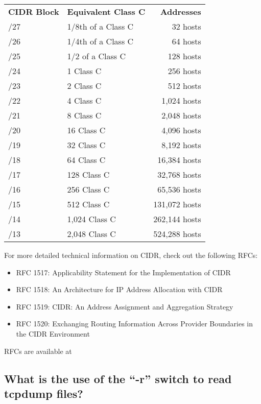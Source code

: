 \documentclass{article}
\begin{document}
\begin{center}
\begin{tabular}{llr}
{\bf CIDR Block} & {\bf Equivalent Class C} & {\bf Addresses}\\
/27 & 1/8th of a Class C & 32 hosts \\
/26 & 1/4th of a Class C & 64 hosts\\
/25 & 1/2 of a Class C & 128 hosts\\
/24 & 1 Class C & 256 hosts\\
/23 & 2 Class C & 512 hosts\\
/22 & 4 Class C & 1,024 hosts\\
/21 & 8 Class C & 2,048 hosts\\
/20 & 16 Class C & 4,096 hosts\\
/19 & 32 Class C & 8,192 hosts\\
/18 & 64 Class C & 16,384 hosts\\
/17 & 128 Class C & 32,768 hosts\\
/16 & 256 Class C & 65,536 hosts \\ 
/15 & 512 Class C & 131,072 hosts\\
/14 & 1,024 Class C & 262,144 hosts\\
/13 & 2,048 Class C & 524,288 hosts\\
\end{tabular}
\end{center}

For more detailed technical information on CIDR, check out the following RFCs:


\begin{itemize}
\item RFC 1517: Applicability Statement for the Implementation of CIDR
\item RFC 1518: An Architecture for IP Address Allocation with CIDR
\item RFC 1519: CIDR: An Address Assignment and Aggregation Strategy
\item RFC 1520: Exchanging Routing Information Across Provider Boundaries in the CIDR Environment
\end{itemize}

RFCs are available at 

\subsection{What is the use of the ``-r'' switch to read tcpdump files?  }
\end{document}

